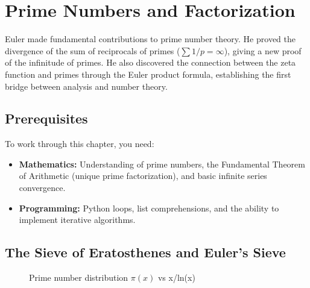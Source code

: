 
\chapter{Prime Numbers and Factorization}

\begin{historical}
Euler made fundamental contributions to prime number theory. He proved the divergence of
the sum of reciprocals of primes ($\sum 1/p = \infty$), giving a new proof of the
infinitude of primes. He also discovered the connection between the zeta function
and primes through the Euler product formula, establishing the first bridge between
analysis and number theory.
\end{historical}

\section{Prerequisites}

To work through this chapter, you need:
\begin{itemize}
    \item \textbf{Mathematics:} Understanding of prime numbers, the Fundamental Theorem of Arithmetic (unique prime factorization), and basic infinite series convergence.
    \item \textbf{Programming:} Python loops, list comprehensions, and the ability to implement iterative algorithms.
\end{itemize}

\section{The Sieve of Eratosthenes and Euler's Sieve}

\begin{figure}[H]
\centering
{}
\caption{Prime number distribution $\pi(x)$ vs x/ln(x)}
\label{fig:primes}
\end{figure}

